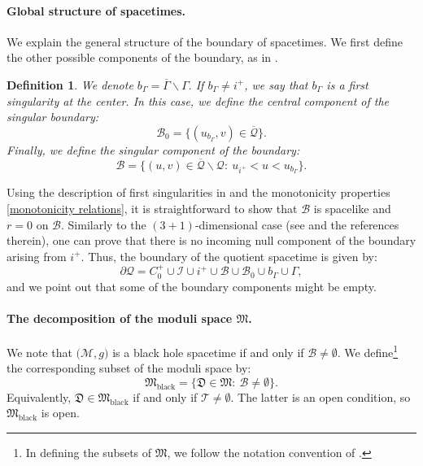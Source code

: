 \documentclass[11pt]{article}
\newtheorem{definition}{Definition}[section]
\numberwithin{equation}{section}
\begin{document}
\paragraph{Global structure of spacetimes.} We explain the general structure of the boundary of spacetimes. We first define the other possible components of the boundary, as in \cite{C99-GL,kommemi}.
\begin{definition}
    We denote $b_{\Gamma}=\overline{\Gamma}\backslash\Gamma.$  If $b_{\Gamma}\neq i^+$, we say that $b_{\Gamma}$ is a first singularity at the center. In this case, we define the \textit{central component of the singular boundary}:
    \vspace{-0.2em}
\[\mathcal{B}_0=\Big\{(u_{b_{\Gamma}},v)\in\overline{\mathcal{Q}}\Big\}.\]
\vspace{-0.5em}
Finally, we define the \textit{singular component of the boundary}:
\[\mathcal{B}=\Big\{(u,v)\in\overline{\mathcal{Q}}\backslash\mathcal{Q}:\ u_{i^+}<u<u_{b_{\Gamma}}\Big\}.\]
\end{definition}
\vspace{-0.2em}
Using the description of first singularities in  and the monotonicity properties \eqref{monotonicity relations}, it is straightforward to show that $\mathcal{B}$ is spacelike and $r=0$ on $\mathcal{B}$. Similarly to the $(3+1)$-dimensional case (see \cite[Section~1.4.1]{kommemi} and the references therein), one can prove that there is no incoming null component of the boundary arising from $i^+.$ Thus, the boundary of the quotient spacetime is given by: 
\begin{equation}
    \partial\mathcal{Q}=C_0^+\cup\mathcal{I}\cup i^+\cup\mathcal{B}\cup\mathcal{B}_0\cup b_{\Gamma}\cup\Gamma,
\end{equation}
and we point out that some of the boundary components might be empty.
\vspace{-0.4em}
\paragraph{The decomposition of the moduli space $\mathfrak{M}$.} We note that $\big(\mathcal{M},g\big)$ is a black hole spacetime if and only if $\mathcal{B}\neq\emptyset$. We define\footnote{In defining the subsets of $\mathfrak{M}$, we follow the notation convention of \cite{AKU26}.} the corresponding subset of the moduli space by:
\begin{equation}\label{M black}
    \mathfrak{M}_{\mathrm{black}}=\big\{\mathfrak{D}\in\mathfrak{M}:\ \mathcal{B}\neq\emptyset\big\}.
\end{equation}
Equivalently, $\mathfrak{D}\in\mathfrak{M}_{\mathrm{black}}$ if and only if $\mathcal{T}\neq\emptyset.$ The latter is an open condition, so $\mathfrak{M}_{\mathrm{black}}$ is open.
\end{document}
